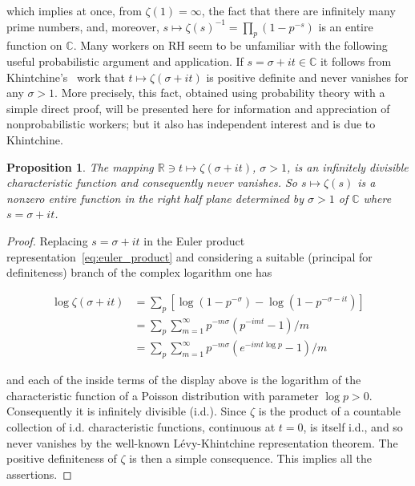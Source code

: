 \documentclass[11pt]{article}
\newtheorem{proposition}{Proposition}
\begin{document}
which implies at once, from $\zeta(1) = \infty$, the fact that there are infinitely many prime numbers, and, moreover, $s \mapsto \zeta(s)^{-1} = \prod_p(1 - p^{-s})$ is an entire function on $\mathbb{C}$. Many workers on RH seem to be unfamiliar with the following useful probabilistic argument and application. If $s = \sigma + it \in \mathbb{C}$ it follows from Khintchine's~\cite{khintchine} work that $t \mapsto \zeta(\sigma + it)$ is positive definite and never vanishes for any $\sigma > 1$. More precisely, this fact, obtained using probability theory with a simple direct proof, will be presented here for information and appreciation of nonprobabilistic workers; but it also has independent interest and is due to Khintchine.

\begin{proposition}
\label{prop:khintchine}
The mapping $\mathbb{R} \ni t \mapsto \zeta(\sigma+it)$, $\sigma > 1$, is an infinitely divisible characteristic function and consequently never vanishes. So $s \mapsto \zeta(s)$ is a nonzero entire function in the right half plane determined by $\sigma > 1$ of $\mathbb{C}$ where $s = \sigma + it$.
\end{proposition}

\begin{proof}
Replacing $s = \sigma + it$ in the Euler product representation~\eqref{eq:euler_product} and considering a suitable (principal for definiteness) branch of the complex logarithm one has

\begin{align}
\label{eq:log_zeta}
\log \zeta(\sigma + it) &= \sum_p \left[ \log(1 - p^{-\sigma}) - \log(1 - p^{-\sigma-it}) \right] \\
&= \sum_p \sum_{m=1}^\infty p^{-m\sigma} (p^{-imt} - 1)/m \nonumber \\
&= \sum_p \sum_{m=1}^\infty p^{-m\sigma} (e^{-imt \log p} - 1)/m \nonumber
\end{align}

and each of the inside terms of the display above is the logarithm of the characteristic function of a Poisson distribution with parameter $\log p > 0$. Consequently it is infinitely divisible (i.d.). Since $\zeta$ is the product of a countable collection of i.d. characteristic functions, continuous at $t = 0$, is itself i.d., and so never vanishes by the well-known Lévy-Khintchine representation theorem. The positive definiteness of $\zeta$ is then a simple consequence. This implies all the assertions.
\end{proof}
\end{document}
